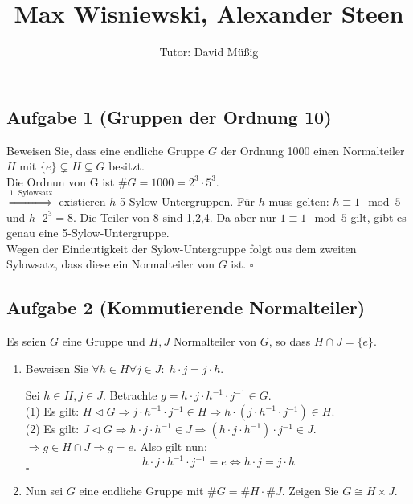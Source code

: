\documentclass[11pt,a4paper,ngerman]{article}
\author{Tutor: David Müßig}
\date{}
\title{Max Wisniewski, Alexander Steen}
\begin{document}

\maketitle
\thispagestyle{fancy}


\subsection*{Aufgabe 1 \mdseries (Gruppen der Ordnung 10)}
Beweisen Sie, dass eine endliche Gruppe $G$ der Ordnung 1000 einen Normalteiler $H$
mit $\{e\} \subsetneq H \subsetneq G$ besitzt. \\

Die Ordnun von G ist $\#G = 1000 = 2^3 \cdot 5^3$. \\
$\stackrel{\text{1. Sylowsatz}}{\Rightarrow}$ existieren $h$ 5-Sylow-Untergruppen.  Für $h$ muss gelten: $h \equiv 1 \mod 5$ und $h \, | \, 2^3 = 8$. Die Teiler von 8 sind 1,2,4. Da aber nur $1 \equiv 1 \mod 5$ gilt, gibt es genau eine 5-Sylow-Untergruppe. \\
Wegen der Eindeutigkeit der Sylow-Untergruppe folgt aus dem zweiten Sylowsatz, dass diese ein Normalteiler von $G$ ist.
\mbox{} \hfill $\square$



\subsection*{Aufgabe 2 \mdseries (Kommutierende Normalteiler)}
Es seien $G$ eine Gruppe und $H,J$ Normalteiler von $G$, so dass $H \cap J = \{e\}$.
\begin{enumerate}[\bfseries a)]
\item  Beweisen Sie $\forall h \in H\forall j \in J :\; h \cdot j = j \cdot h$.

Sei $h \in H, j \in J$. Betrachte $g = h \cdot j \cdot h^{-1} \cdot j^{-1} \in G$. \\
(1) Es gilt: $H \lhd G \Rightarrow j \cdot h^{-1} \cdot j^{-1} \in H \Rightarrow h \cdot (j \cdot h^{-1} \cdot j^{-1}) \in H$. \\
(2) Es gilt: $J \lhd G \Rightarrow h \cdot j \cdot h^{-1} \in J \Rightarrow (h \cdot j \cdot h^{-1}) \cdot j^{-1} \in J$. \\
$\Rightarrow g \in H \cap J \Rightarrow g = e$.
Also gilt nun:
$$
h \cdot j \cdot h^{-1} \cdot j^{-1} = e \Leftrightarrow h \cdot j = j \cdot h
$$
\mbox{} \hfill $\square$
\item  Nun sei $G$ eine endliche Gruppe mit $\#G = \#H \cdot \#J$. Zeigen Sie $G \cong H \times J$.
\end{enumerate}
\end{document}
